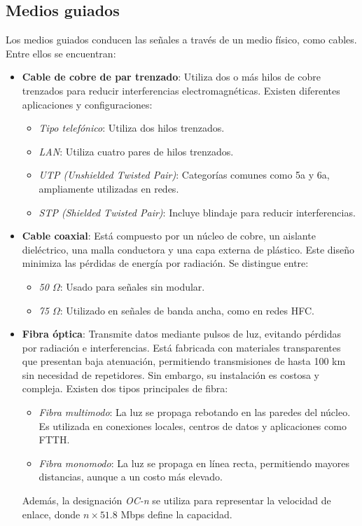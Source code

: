 \documentclass{article}
\begin{document}
\subsection{Medios guiados}
Los medios guiados conducen las señales a través de un medio físico, como cables. Entre ellos se encuentran:
\begin{itemize}
    \item \textbf{Cable de cobre de par trenzado}: Utiliza dos o más hilos de cobre trenzados para reducir interferencias electromagnéticas. Existen diferentes aplicaciones y configuraciones:
    \begin{itemize}
        \item \textit{Tipo telefónico}: Utiliza dos hilos trenzados.
        \item \textit{LAN}: Utiliza cuatro pares de hilos trenzados.
        \item \textit{UTP (Unshielded Twisted Pair)}: Categorías comunes como 5a y 6a, ampliamente utilizadas en redes.
        \item \textit{STP (Shielded Twisted Pair)}: Incluye blindaje para reducir interferencias.
    \end{itemize}
    
    \item \textbf{Cable coaxial}: Está compuesto por un núcleo de cobre, un aislante dieléctrico, una malla conductora y una capa externa de plástico. Este diseño minimiza las pérdidas de energía por radiación. Se distingue entre:
    \begin{itemize}
        \item \textit{50 $\Omega$}: Usado para señales sin modular.
        \item \textit{75 $\Omega$}: Utilizado en señales de banda ancha, como en redes HFC.
    \end{itemize}
    
    \item \textbf{Fibra óptica}: Transmite datos mediante pulsos de luz, evitando pérdidas por radiación e interferencias. Está fabricada con materiales transparentes que presentan baja atenuación, permitiendo transmisiones de hasta 100 km sin necesidad de repetidores. Sin embargo, su instalación es costosa y compleja. Existen dos tipos principales de fibra:
    \begin{itemize}
        \item \textit{Fibra multimodo}: La luz se propaga rebotando en las paredes del núcleo. Es utilizada en conexiones locales, centros de datos y aplicaciones como FTTH.
        \item \textit{Fibra monomodo}: La luz se propaga en línea recta, permitiendo mayores distancias, aunque a un costo más elevado.
    \end{itemize}
    Además, la designación \textit{OC-n} se utiliza para representar la velocidad de enlace, donde $n \times 51.8$ Mbps define la capacidad.
\end{itemize}
\end{document}
